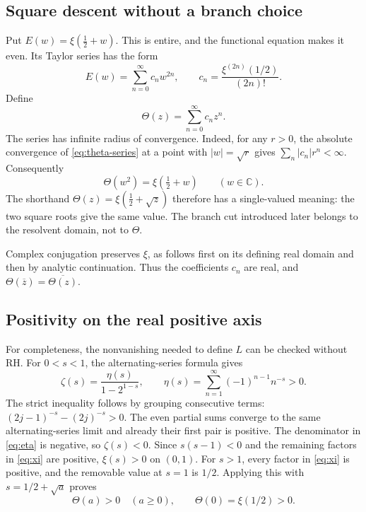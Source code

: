 \documentclass[11pt,a4paper]{article}
\numberwithin{equation}{section}
\theoremstyle{definition}
\theoremstyle{remark}
\newcommand{\C}{\mathbb C}
\begin{document}
\subsection{Square descent without a branch choice}

Put $E(w)=\xi(\tfrac12+w)$. This is entire, and the functional equation
makes it even. Its Taylor series has the form
\begin{equation}\label{eq:theta-series}
E(w)=\sum_{n=0}^{\infty}c_nw^{2n},\qquad
c_n=\frac{\xi^{(2n)}(1/2)}{(2n)!}.
\end{equation}
Define
\begin{equation}\label{eq:theta-definition}
\Theta(z)=\sum_{n=0}^{\infty}c_nz^n.
\end{equation}
The series has infinite radius of convergence. Indeed, for any $r>0$,
the absolute convergence of \eqref{eq:theta-series} at a point with
$|w|=\sqrt r$ gives $\sum_n|c_n|r^n<\infty$.
Consequently
\begin{equation}\label{eq:square-descent}
\Theta(w^2)=\xi(\tfrac12+w)\qquad(w\in\C).
\end{equation}
The shorthand $\Theta(z)=\xi(\tfrac12+\sqrt z)$ therefore has a
single-valued meaning: the two square roots give the same value. The branch
cut introduced later belongs to the resolvent domain, not to $\Theta$.

Complex conjugation preserves $\xi$, as follows first on its defining
real domain and then by analytic continuation. Thus the coefficients
$c_n$ are real, and
$\Theta(\overline z)=\overline{\Theta(z)}$.

\subsection{Positivity on the real positive axis}

For completeness, the nonvanishing needed to define $L$ can be checked
without RH. For $0<s<1$, the alternating-series formula
\cite[Eq.~25.2.3]{dlmf-series} gives
\begin{equation}\label{eq:eta}
\zeta(s)=\frac{\eta(s)}{1-2^{1-s}},\qquad
\eta(s)=\sum_{n=1}^{\infty}(-1)^{n-1}n^{-s}>0.
\end{equation}
The strict inequality follows by grouping consecutive terms:
$(2j-1)^{-s}-(2j)^{-s}>0$. The even partial sums converge to the same
alternating-series limit and already their first pair is positive.
The denominator in \eqref{eq:eta} is negative, so $\zeta(s)<0$.
Since $s(s-1)<0$ and the remaining factors in \eqref{eq:xi} are positive,
$\xi(s)>0$ on $(0,1)$. For $s>1$, every factor in \eqref{eq:xi}
is positive, and the removable value at $s=1$ is $1/2$.
Applying this with $s=1/2+\sqrt a$ proves
\begin{equation}\label{eq:theta-positive}
\Theta(a)>0\quad(a\geq0),\qquad\Theta(0)=\xi(1/2)>0.
\end{equation}
\end{document}
